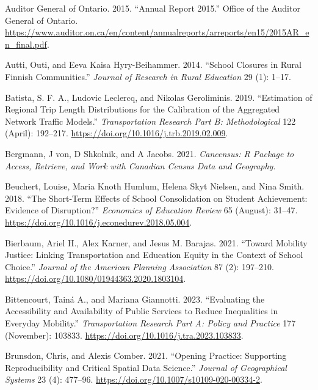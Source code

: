 \documentclass[
default
]{sn-jnl}
\newlength{\cslhangindent}
\newenvironment{CSLReferences}[2] %
 {\begin{list}{}{%
  \setlength{\itemindent}{0pt}
  \setlength{\leftmargin}{0pt}
  \setlength{\parsep}{0pt}
  \ifodd #1
   \setlength{\leftmargin}{\cslhangindent}
   \setlength{\itemindent}{-1\cslhangindent}
  \fi
  \setlength{\itemsep}{#2\baselineskip}}}
 {\end{list}}
\begin{document}
\label{refs}
\begin{CSLReferences}{1}{0}
Auditor General of Ontario. 2015. {``Annual Report 2015.''} Office of
the Auditor General of Ontario.
\url{https://www.auditor.on.ca/en/content/annualreports/arreports/en15/2015AR_en_final.pdf}.

Autti, Outi, and Eeva Kaisa Hyry-Beihammer. 2014. {``School Closures in
Rural Finnish Communities.''} \emph{Journal of Research in Rural
Education} 29 (1): 1--17.

Batista, S. F. A., Ludovic Leclercq, and Nikolas Geroliminis. 2019.
{``Estimation of Regional Trip Length Distributions for the Calibration
of the Aggregated Network Traffic Models.''} \emph{Transportation
Research Part B: Methodological} 122 (April): 192--217.
\url{https://doi.org/10.1016/j.trb.2019.02.009}.

Bergmann, J von, D Shkolnik, and A Jacobs. 2021. \emph{Cancensus: R
Package to Access, Retrieve, and Work with Canadian Census Data and
Geography}.

Beuchert, Louise, Maria Knoth Humlum, Helena Skyt Nielsen, and Nina
Smith. 2018. {``The Short-Term Effects of School Consolidation on
Student Achievement: Evidence of Disruption?''} \emph{Economics of
Education Review} 65 (August): 31--47.
\url{https://doi.org/10.1016/j.econedurev.2018.05.004}.

Bierbaum, Ariel H., Alex Karner, and Jesus M. Barajas. 2021. {``Toward
{Mobility Justice}: {Linking Transportation} and {Education Equity} in
the {Context} of {School Choice}.''} \emph{Journal of the American
Planning Association} 87 (2): 197--210.
\url{https://doi.org/10.1080/01944363.2020.1803104}.

Bittencourt, Tainá A., and Mariana Giannotti. 2023. {``Evaluating the
Accessibility and Availability of Public Services to Reduce Inequalities
in Everyday Mobility.''} \emph{Transportation Research Part A: Policy
and Practice} 177 (November): 103833.
\url{https://doi.org/10.1016/j.tra.2023.103833}.

Brunsdon, Chris, and Alexis Comber. 2021. {``Opening Practice:
Supporting Reproducibility and Critical Spatial Data Science.''}
\emph{Journal of Geographical Systems} 23 (4): 477--96.
\url{https://doi.org/10.1007/s10109-020-00334-2}.


\end{CSLReferences}
\end{document}
